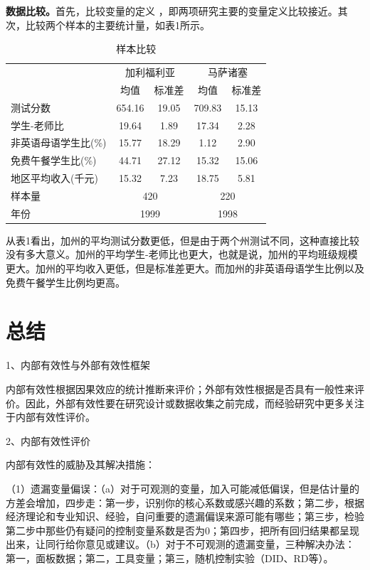\documentclass[cn,10pt,math=newtx,citestyle=gb7714-2015,bibstyle=gb7714-2015]{elegantbook}
\begin{document}
\textbf{数据比较。}首先，比较变量的定义 ，即两项研究主要的变量定义比较接近。其次，比较两个样本的主要统计量，如表1所示。
\begin{center}
	\begin{table}[!h]
		\caption{样本比较}\label{tab:digit}
		\begin{center}
			\begin{tabular}{lcccc}
				\hline
				&\multicolumn{2}{c}{加利福利亚}&\multicolumn{2}{c}{马萨诸塞}\\
				\cline{2-5}
				&均值&标准差&均值&标准差\\
				\cline{1-5}
				测试分数&654.16&19.05&709.83&15.13\\
				学生-老师比&19.64&1.89&17.34&2.28\\
				非英语母语学生比(\%)&15.77&18.29&1.12&2.90\\
				免费午餐学生比(\%)&44.71&27.12&15.32&15.06\\
				地区平均收入(千元)&15.32&7.23&18.75&5.81\\
				样本量&\multicolumn{2}{c}{420}&\multicolumn{2}{c}{220}\\
				年份&\multicolumn{2}{c}{1999}&\multicolumn{2}{c}{1998}\\
				\hline
			\end{tabular}
		\end{center}
	\end{table}
\end{center}

从表1看出，加州的平均测试分数更低，但是由于两个州测试不同，这种直接比较没有多大意义。加州的平均学生-老师比也更大，也就是说，加州的平均班级规模更大。加州的平均收入更低，但是标准差更大。而加州的非英语母语学生比例以及免费午餐学生比例均更高。


\section{总结}
1、内部有效性与外部有效性框架

内部有效性根据因果效应的统计推断来评价；外部有效性根据是否具有一般性来评价。因此，外部有效性要在研究设计或数据收集之前完成，而经验研究中更多关注于内部有效性评价。

2、内部有效性评价

内部有效性的威胁及其解决措施：

（1）遗漏变量偏误：（a）对于可观测的变量，加入可能减低偏误，但是估计量的方差会增加，四步走：第一步，识别你的核心系数或感兴趣的系数；第二步，根据经济理论和专业知识、经验，自问重要的遗漏偏误来源可能有哪些；第三步，检验第二步中那些仍有疑问的控制变量系数是否为0；第四步，把所有回归结果都呈现出来，让同行给你意见或建议。（b）对于不可观测的遗漏变量，三种解决办法：第一，面板数据；第二，工具变量；第三，随机控制实验（DID、RD等）。
\end{document}
